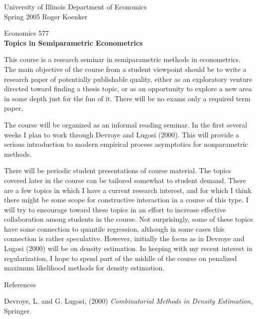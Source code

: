 \documentclass{article}
\begin{document}



\noindent
University of Illinois \hfill Department of Economics \\
Spring 2005 \hfill Roger Koenker
\begin{center}
\large{
{ Economics 577 \\
{\bf Topics in Semiparametric Econometrics}}}
\end{center}

\vspace{3mm}
This course is a research seminar in semiparametric methods in
econometrics.  The main objective of the course from a student viewpoint
should be to write a research paper of potentially publishable quality,
either as an exploratory venture directed toward finding a thesis topic,
or as an opportunity to explore a new area in some depth just for the
fun of it.  There will be no exams only a required term paper,

The course will be organized as an informal reading seminar.  
In the first several weeks I plan to work through Devroye and Lugosi (2000).
This will provide a serious introduction to modern empirical process
asymptotics for nonparametric methods.

There will be periodic student presentations of course material.
The topics covered later in the course can be tailored somewhat to student
demand.  There are a few topics in which I have a current research interest,
and for which I think there might be some scope for constructive interaction 
in a course of this type.  I will try to encourage toward these topics
in an effort to increase effective collaboration among students in the
course.  Not surprisingly, some of these topics have some connection
to quantile regression, although in some cases this connection is rather
speculative.  However, initially the focus as in Devroye and Lugosi (2000)
will be on density estimation.  In keeping with my recent interest in
regularization, I hope to spend part of the middle of the course on
penalized maximum likelihood methods for density estimation.

\begin{center}
References
\end{center}
\vspace{5mm}
Devroye, L. and G. Lugosi, (2000) {\it Combinatorial Methods in Density
Estimation}, Springer.
\end{document}
